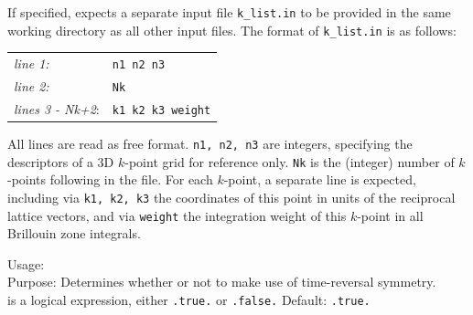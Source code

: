 If specified,  expects a separate input
file \texttt{k\_list.in} to be provided in the same working directory
as all other input files. The format of \texttt{k\_list.in} is as
follows: \\[1.0ex] 
\begin{tabular}{ll}
\emph{line 1:} & \texttt{n1   n2   n3} \\
\emph{line 2:} & \texttt{Nk} \\
\emph{lines 3 - Nk+2}: & \texttt{k1   k2   k3   weight} \\
\end{tabular}

All lines are read as free format. \texttt{n1, n2, n3} are integers,
specifying the descriptors of a 3D $k$-point grid for reference
only. \texttt{Nk} is the (integer) number of $k$-points
following in the file. For each $k$-point, a separate line is
expected, including via \texttt{k1, k2, k3} the coordinates of this
point in units of the reciprocal lattice vectors, and via
\texttt{weight} the integration weight of this $k$-point in all
Brillouin zone integrals.

{
  \noindent
  Usage:   \\[1.0ex]
  Purpose: Determines whether or not to make use of time-reversal symmetry.
  \\[1.0ex] 
   is a logical expression, either \texttt{.true.} or
    \texttt{.false.} Default: \texttt{.true.} \\
}



